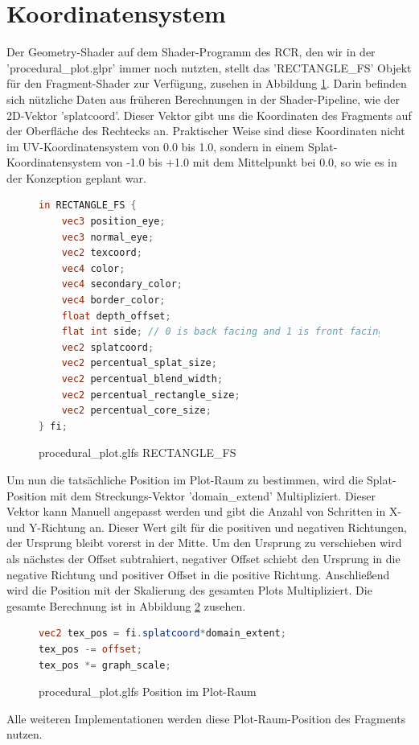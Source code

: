 \section{Koordinatensystem}
Der Geometry-Shader auf dem Shader-Programm des RCR, den wir in der 'procedural\_plot.glpr' immer noch nutzten, stellt das 'RECTANGLE\_FS' Objekt für den Fragment-Shader zur Verfügung, zusehen in Abbildung \ref{fig:code_coord1}.
Darin befinden sich nützliche Daten aus früheren Berechnungen in der Shader-Pipeline, wie der 2D-Vektor 'splatcoord'.
Dieser Vektor gibt uns die Koordinaten des Fragments auf der Oberfläche des Rechtecks an.
Praktischer Weise sind diese Koordinaten nicht im UV-Koordinatensystem von 0.0 bis 1.0, sondern in einem Splat-Koordinatensystem von -1.0 bis +1.0 mit dem Mittelpunkt bei 0.0, so wie es in der Konzeption geplant war.
\begin{figure}[ht]
	\begin{lstlisting}[language=GLSL]
in RECTANGLE_FS {
	vec3 position_eye;
	vec3 normal_eye;
	vec2 texcoord;
	vec4 color;
	vec4 secondary_color;
	vec4 border_color;
	float depth_offset;
	flat int side; // 0 is back facing and 1 is front facing
	vec2 splatcoord;
	vec2 percentual_splat_size;
	vec2 percentual_blend_width;
	vec2 percentual_rectangle_size;
	vec2 percentual_core_size;
} fi;
	\end{lstlisting}
	\caption{procedural\_plot.glfs RECTANGLE\_FS}
	\label{fig:code_coord1}
\end{figure}
\FloatBarrier
\par
Um nun die tatsächliche Position im Plot-Raum zu bestimmen, wird die Splat-Position mit dem Streckungs-Vektor 'domain\_extend' Multipliziert.
Dieser Vektor kann Manuell angepasst werden und gibt die Anzahl von Schritten in X- und Y-Richtung an.
Dieser Wert gilt für die positiven und negativen Richtungen, der Ursprung bleibt vorerst in der Mitte.
Um den Ursprung zu verschieben wird als nächstes der Offset subtrahiert, negativer Offset schiebt den Ursprung in die negative Richtung und positiver Offset in die positive Richtung.
Anschließend wird die Position mit der Skalierung des gesamten Plots Multipliziert.
Die gesamte Berechnung ist in Abbildung \ref{fig:code_coord2} zusehen.
\begin{figure}[ht]
	\begin{lstlisting}[language=GLSL]
vec2 tex_pos = fi.splatcoord*domain_extent;
tex_pos -= offset;
tex_pos *= graph_scale;
	\end{lstlisting}
	\caption{procedural\_plot.glfs Position im Plot-Raum}
	\label{fig:code_coord2}
\end{figure}
\FloatBarrier
\par
Alle weiteren Implementationen werden diese Plot-Raum-Position des Fragments nutzen. 



